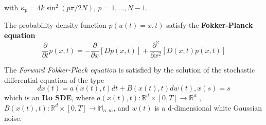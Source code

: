 \documentclass[12pt]{report}
\begin{document}
with $\kappa_p=4k\sin^2(p\pi/2N)$, $p=1,...,N-1$.

The probability density function $p(u(t)=x,t)$ satisfy the \textbf{Fokker-Planck equation}
\begin{equation*}
\frac{\partial}{\partial t}p(x,t) = -\frac{\partial}{\partial x}\left[Dp(x,t)\right] + \frac{\partial^2}{\partial x^2}\left[ D(x,t)p(x,t)\right]
\end{equation*}

The \textit{Forward Fokker-Plack equation} is satisfied by the solution of the stochastic differential equation of the type 
\begin{equation*}
dx(t)= a(x(t),t)dt+B(x(t),t)dw(t), x(s)=s
\end{equation*}
which is an \textbf{Ito SDE}, where $a(x(t),t):\mathbb{R}^d\times[0,T]\rightarrow \mathbb{R}^d$ , $B(x(t),t):\mathbb{R}^d\times [0,T]\rightarrow \mathbb{M}_{n,m}$, and $w(t)$ is a d-dimensional white Gaussian noise.
\end{document}
